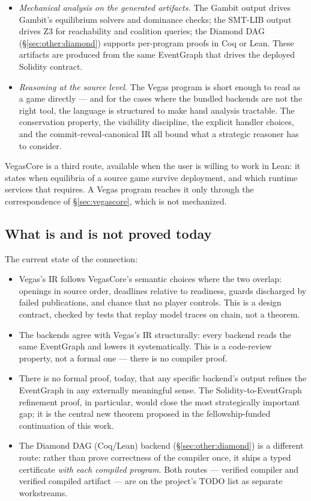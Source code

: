 \begin{itemize}\itemsep2pt
\item \emph{Mechanical analysis on the generated artifacts.}  The
  Gambit  output drives Gambit's equilibrium solvers
  and dominance checks; the SMT-LIB output drives Z3 for
  reachability and coalition queries; the Diamond DAG
  (\S\ref{sec:other:diamond}) supports per-program proofs in
  Coq or Lean.  These artifacts are produced from the same
  EventGraph that drives the deployed Solidity contract.
\item \emph{Reasoning at the source level.}  The Vegas program
  is short enough to read as a game directly --- and for the
  cases where the bundled backends are not the right tool, the
  language is structured to make hand analysis tractable.  The
  conservation property, the visibility discipline, the explicit
  handler choices, and the commit-reveal-canonical IR all bound
  what a strategic reasoner has to consider.
\end{itemize}

VegasCore is a third route, available when the user is willing
to work in Lean: it states when equilibria of a source game survive
deployment, and which runtime services that requires.  A Vegas
program reaches it only through the correspondence of
\S\ref{sec:vegascore}, which is not mechanized.

\subsection{What is and is not proved today}

The current state of the connection:

\begin{itemize}\itemsep1pt
\item Vegas's IR follows VegasCore's semantic choices where the two
  overlap: openings in source order, deadlines relative to readiness,
  guards discharged by failed publications, and chance that no
  player controls.  This is a design contract, checked by tests
  that replay model traces on chain, not a theorem.
\item The backends agree with Vegas's IR structurally: every
  backend reads the same EventGraph and lowers it
  systematically.  This is a code-review property, not a formal
  one --- there is no compiler proof.
\item There is no formal proof, today, that any specific
  backend's output refines the EventGraph in any externally
  meaningful sense.  The Solidity-to-EventGraph refinement
  proof, in particular, would close the most strategically
  important gap; it is the central new theorem proposed in the
  fellowship-funded continuation of this work.
\item The Diamond DAG (Coq/Lean) backend
  (\S\ref{sec:other:diamond}) is a different route: rather than
  prove correctness of the compiler once, it ships a typed
  certificate \emph{with each compiled program}.  Both routes
  --- verified compiler and verified compiled artifact --- are
  on the project's TODO list as separate workstreams.
\end{itemize}

